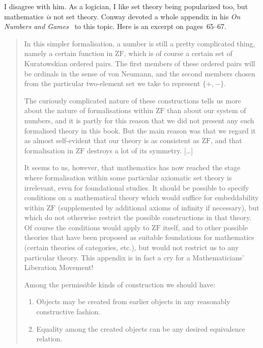 \documentclass{bhamthesis}
\theoremstyle{definition}
\newcommand{\bktitle}[1]{\textit{#1}}
\newcommand{\ZF}{\mathrm{ZF}}
\begin{document}
I disagree with him.  As a logician, I like set theory being
popularized too, but mathematics \emph{is} not set theory. Conway
devoted a whole appendix in his \bktitle{On Numbers and
Games}~\cite{book:numgames} to this topic.  Here is an excerpt on
pages~65--67.

\begin{quotation}
 In this simpler formalisation, a number is still a pretty
 complicated thing, namely a certain function in $\ZF$, which is
 of course a certain set of Kuratowskian ordered pairs.  The first
 members of these ordered pairs will be ordinals in the sense of
 von Neumann, and the second members chosen from the particular
 two-element set we take to represent $\{{+},{-}\}$.

 The curiously complicated nature of these constructions tells us
 more about the nature of formalisations within $\ZF$ than about
 our system of numbers, and it is partly for this reason that we
 did not present any such formalised theory in this book. But the
 main reason was that we regard it as almost self-evident that our
 theory is as consistent as $\ZF$, and that formalisation in $\ZF$
 destroys a lot of its symmetry.  [\ldots]

 It seems to us, however, that mathematics has now reached the
 stage where formalisation within some particular axiomatic set
 theory is irrelevant, even for foundational studies. It should be
 possible to specify conditions on a mathematical theory which
 would suffice for embeddability within $\ZF$ (supplemented by
 additional axioms of infinity if necessary), but which do not
 otherwise restrict the possible constructions in that theory. Of
 course the conditions would apply to $\ZF$ itself, and to other
 possible theories that have been proposed as suitable foundations
 for mathematics (certain theories of categories, etc.), but would
 not restrict us to any particular theory.  This appendix is in
 fact a cry for a Mathematicians' Liberation Movement!

 Among the permissible kinds of construction we should have:
 \begin{enumerate}
 \renewcommand{\theenumi}{\roman{enumi}}  %
 \renewcommand{\labelenumi}{(\theenumi)}
 \item Objects may be created from earlier objects in any
   reasonably constructive fashion.
 \item Equality among the created objects can be any desired
   equivalence relation.
 \end{enumerate}


\end{quotation}
\end{document}
